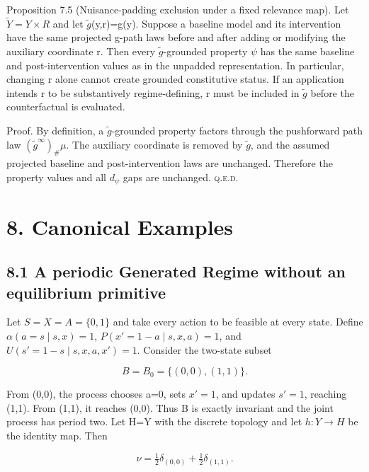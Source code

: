 \documentclass[10pt]{article}
\newcommand{\push}{\mathord{\#}}
\begin{document}
Proposition 7.5 (Nuisance-padding exclusion under a fixed relevance
map). Let \(\ensuremath{\widetilde Y}=Y\times{}R\) and let \ensuremath{\widetilde g}(y,r)=g(y). Suppose a baseline model
and its intervention have the same projected g-path laws before and
after adding or modifying the auxiliary coordinate r. Then every
\ensuremath{\widetilde g}-grounded property \(\psi\) has the same baseline and post-intervention
values as in the unpadded representation. In particular, changing r
alone cannot create grounded constitutive status. If an application
intends r to be substantively regime-defining, r must be included in \ensuremath{\widetilde g}
before the counterfactual is evaluated.

Proof. By definition, a \ensuremath{\widetilde g}-grounded property factors through the
pushforward path law \((\widetilde g^\infty)_{\push}\mu\). The auxiliary
coordinate is removed by \ensuremath{\widetilde g}, and the assumed projected baseline and
post-intervention laws are unchanged. Therefore the property values and
all \(d_\psi\) gaps are unchanged. \hfill\textsc{q.e.d.}

\section{8. Canonical Examples}\label{canonical-examples}

\subsection{8.1 A periodic Generated Regime without an equilibrium
primitive}\label{a-periodic-generated-regime-without-an-equilibrium-primitive}

Let \(S=X=A=\{0,1\}\) and take every action to be feasible at every
state. Define \(\alpha(a=s\mid s,x)=1\), \(P(x'=1-a\mid s,x,a)=1\), and
\(U(s'=1-s\mid s,x,a,x')=1\). Consider the two-state subset

\begin{equation}
B=B_0=\{(0,0),(1,1)\}.
\tag{19}\label{eq:19}
\end{equation}

From (0,0), the process chooses a=0, sets \(x'=1\), and updates
\(s'=1\), reaching (1,1). From (1,1), it reaches (0,0). Thus B is
exactly invariant and the joint process has period two. Let H=Y with the
discrete topology and let \(h:Y\to{}H\) be the identity map. Then

\begin{equation}
\nu=\tfrac12\delta_{(0,0)}+\tfrac12\delta_{(1,1)}.
\tag{20}\label{eq:20}
\end{equation}
\end{document}
